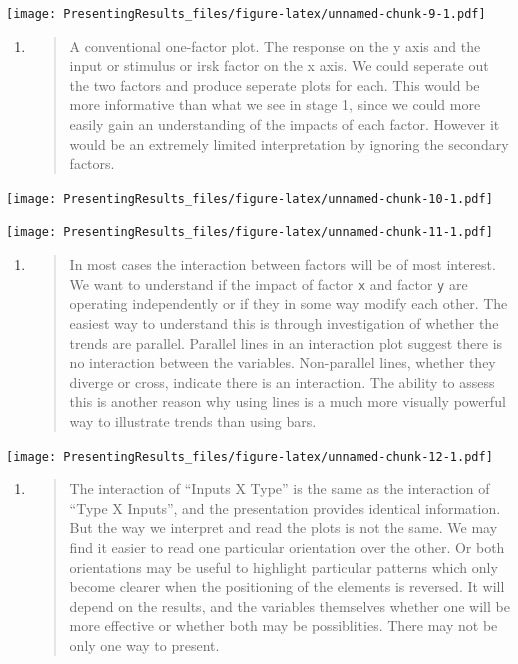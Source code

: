 \documentclass[
]{book}
\begin{document}
\texttt{[image: PresentingResults\_files/figure-latex/unnamed-chunk-9-1.pdf]}

\begin{enumerate}
\def\labelenumi{\arabic{enumi}.}
\setcounter{enumi}{1}
\item
  \begin{quote}
  A conventional one-factor plot. The response on the y axis and the input or stimulus or irsk factor on the x axis.
  We could seperate out the two factors and produce seperate plots for each. This would be more informative than what we see in stage 1, since we could more easily gain an understanding of the impacts of each factor. However it would be an extremely limited interpretation by ignoring the secondary factors.
  \end{quote}
\end{enumerate}

\texttt{[image: PresentingResults\_files/figure-latex/unnamed-chunk-10-1.pdf]}

\texttt{[image: PresentingResults\_files/figure-latex/unnamed-chunk-11-1.pdf]}

\begin{enumerate}
\def\labelenumi{\arabic{enumi}.}
\setcounter{enumi}{2}
\item
  \begin{quote}
  In most cases the interaction between factors will be of most interest. We want to understand if the impact of factor \texttt{x} and factor \texttt{y} are operating independently or if they in some way modify each other. The easiest way to understand this is through investigation of whether the trends are parallel. Parallel lines in an interaction plot suggest there is no interaction between the variables. Non-parallel lines, whether they diverge or cross, indicate there is an interaction. The ability to assess this is another reason why using lines is a much more visually powerful way to illustrate trends than using bars.
  \end{quote}
\end{enumerate}

\texttt{[image: PresentingResults\_files/figure-latex/unnamed-chunk-12-1.pdf]}

\begin{enumerate}
\def\labelenumi{\arabic{enumi}.}
\setcounter{enumi}{3}
\item
  \begin{quote}
  The interaction of ``Inputs X Type'' is the same as the interaction of ``Type X Inputs'', and the presentation provides identical information. But the way we interpret and read the plots is not the same. We may find it easier to read one particular orientation over the other. Or both orientations may be useful to highlight particular patterns which only become clearer when the positioning of the elements is reversed. It will depend on the results, and the variables themselves whether one will be more effective or whether both may be possiblities. There may not be only one way to present.
  \end{quote}
\end{enumerate}
\end{document}
